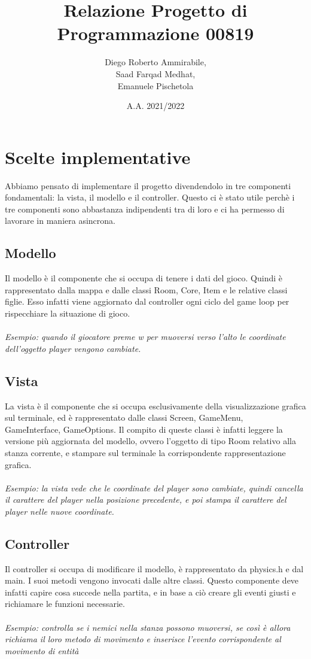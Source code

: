 \documentclass{article}
\title{Relazione Progetto di Programmazione 00819}
\author{Diego Roberto Ammirabile, \\Saad Farqad Medhat, \\Emanuele Pischetola}
\date{A.A. 2021/2022}
\begin{document}
\maketitle

\section{Scelte implementative}
Abbiamo pensato di implementare il progetto divendendolo in tre componenti fondamentali: la vista, il modello e il controller. Questo ci è stato utile perchè i tre componenti sono abbastanza indipendenti tra di loro e ci ha permesso di lavorare in maniera asincrona.

\subsection{Modello}
Il modello è il componente che si occupa di tenere i dati del gioco. Quindi è rappresentato dalla mappa e dalle classi Room, Core, Item e le relative classi figlie.
Esso infatti viene aggiornato dal controller ogni ciclo del game loop per rispecchiare la situazione di gioco.
\\\\
\textit{Esempio: quando il giocatore preme w per muoversi verso l'alto le coordinate dell'oggetto player vengono cambiate.}

\subsection{Vista}
La vista è il componente che si occupa esclusivamente della visualizzazione grafica sul terminale, ed è rappresentato dalle classi Screen, GameMenu,\\ GameInterface, GameOptions. 
Il compito di queste classi è infatti leggere la versione più aggiornata del modello, ovvero l'oggetto di tipo Room relativo alla stanza corrente, e stampare sul terminale la corrispondente rappresentazione grafica.
\\\\
\textit{Esempio: la vista vede che le coordinate del player sono cambiate, quindi cancella il carattere del player nella posizione precedente, e poi stampa il carattere del player nelle nuove coordinate.}

\subsection{Controller}
Il controller si occupa di modificare il modello, è rappresentato da physics.h e dal main. I suoi metodi vengono invocati dalle altre classi. Questo componente deve infatti capire cosa succede nella partita, e in base a ciò creare gli eventi giusti e richiamare le funzioni necessarie.
\\\\
\textit{Esempio: controlla se i nemici nella stanza possono muoversi, se così è allora richiama il loro metodo di movimento e inserisce l'evento corrispondente al movimento di entità}
\end{document}
